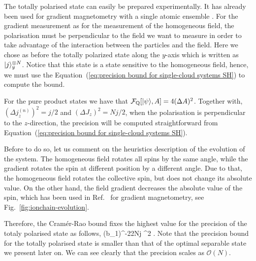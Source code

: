 
The totally polarised state can easily be prepared experimentally.
It has already been used for gradient magnetometry with a single atomic ensemble \cite{Koschorreck2011,Vengalattore2007}.
For the gradient measurement as for the measurement of the homogeneous field, the polarisation must be perpendicular to the field we want to measure in order to take advantage of the interaction between the particles and the field.
Here we chose as before the totally polarized state along the $y$-axis which is written as $\vert j \rangle_y^{\otimes N}$.
Notice that this state is a state sensitive to the homogeneous field, hence, we must use the Equation~(\ref{eq:precision bound for single-cloud systems SH}) to compute the bound.

For the pure product states we have that $\mathcal{F}_{\textnormal{Q}}[{\textstyle \vert \psi \rangle, A}] = 4(\Delta A)^2$.
Together with,
$(\Delta j_z^{(n)})^2=j/2$ and $(\Delta J_z)^2=Nj/2$, when the polarisation is
perpendicular to the $z$-direction, the precision will be computed straightforward from Equation~(\ref{eq:precision bound for single-cloud systems SH}).

Before to do so, let us comment on the heuristics description of the evolution of the system.
The homogeneous field rotates all spins by the same angle, while the gradient rotates the spin at different position by a different angle.
Due to that, the homogeneous field rotates the collective spin, but does not change its absolute value.
On the other hand, the field gradient decreases the absolute value of the spin, which has been used in Ref.~\cite{Behbood2013} for gradient magnetometry, see Fig.~\ref{fig:ionchain-evolution}.

Therefore, the Cram\'er-Rao bound fixes the highest value for the precision
of the totaly polarised state as follows,
\be
  (\Delta b_1)^{-2}\leqslant 2Nj \sigma^2 .
\ee
Note that the precision bound for the totally polarised state
is smaller than that of the optimal separable state we present later on.
We can see clearly that the precision scales as $\mathcal{O}(N).$


